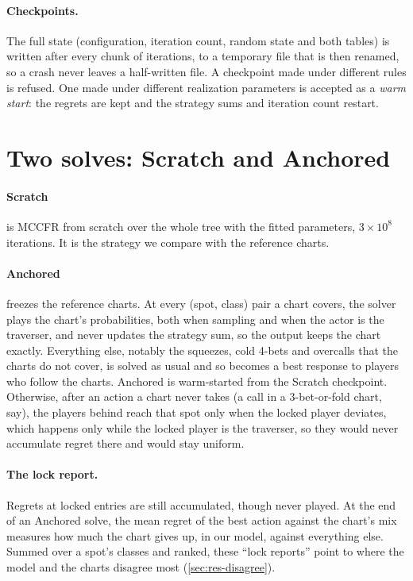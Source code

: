 \paragraph{Checkpoints.} The full state (configuration, iteration count, random state and both tables) is written after every chunk of iterations, to a temporary file that is then renamed, so a crash never leaves a half-written file. A checkpoint made under different rules is refused. One made under different realization parameters is accepted as a \emph{warm start}: the regrets are kept and the strategy sums and iteration count restart.

\section{Two solves: Scratch and Anchored}\label{sec:two-solves}

\paragraph{Scratch} is MCCFR from scratch over the whole tree with the fitted parameters, $3\times 10^8$ iterations. It is the strategy we compare with the reference charts.

\paragraph{Anchored} freezes the reference charts. At every (spot, class) pair a chart covers, the solver plays the chart's probabilities, both when sampling and when the actor is the traverser, and never updates the strategy sum, so the output keeps the chart exactly. Everything else, notably the squeezes, cold 4-bets and overcalls that the charts do not cover, is solved as usual and so becomes a best response to players who follow the charts. Anchored is warm-started from the Scratch checkpoint. Otherwise, after an action a chart never takes (a call in a 3-bet-or-fold chart, say), the players behind reach that spot only when the locked player deviates, which happens only while the locked player is the traverser, so they would never accumulate regret there and would stay uniform.

\paragraph{The lock report.} Regrets at locked entries are still accumulated, though never played. At the end of an Anchored solve, the mean regret of the best action against the chart's mix measures how much the chart gives up, in our model, against everything else. Summed over a spot's classes and ranked, these \enquote{lock reports} point to where the model and the charts disagree most (\cref{sec:res-disagree}).

